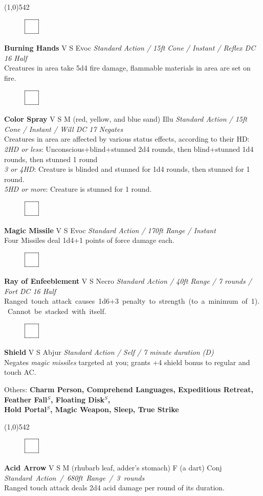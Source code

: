 \documentclass[letterpaper]{article}
\newcommand{\fullline}{\noindent\line(1,0){542} \\}
\newcommand{\spell}[7]{
\begin{figure}
\vspace{-13pt}
\ifstrequal{#2}{Full}{  \includegraphics[width=2em]{Checkbox-Full}}{
\ifstrequal{#2}{Scroll}{\includegraphics[width=2em]{Checkbox-S}}{
                        \includegraphics[width=2em]{Checkbox}}}
\ifstrequal{#7}{}{\vspace{-1em}}{\vspace{#7}}
\end{figure}
\noindent \textbf{#1} #3 {
    \ifstrequal{#4}{Conj}{\color{Plum}Conj}{%
    \ifstrequal{#4}{Divin}{\color{YellowOrange}Divin}{%
    \ifstrequal{#4}{Ench}{\color{VioletRed}Ench}{%
    \ifstrequal{#4}{Trans}{\color{LimeGreen}Trans}{%
    \ifstrequal{#4}{Evoc}{\color{RedOrange}Evoc}{%
    \ifstrequal{#4}{Illu}{\color{ProcessBlue}Illu}{%
    \ifstrequal{#4}{Abjur}{\color{CadetBlue}Abjur}{%
    \ifstrequal{#4}{Necro}{\color{Red}Necro}{%
}}}}}}}}}
{\footnotesize \emph{#5}} \\
#6
}
\newcommand{\s}[0]{$^S$}
\begin{document}
\fullline
\vspace{-1.25em}

\spell{Burning Hands}{}{V S}{Evoc}{Standard Action / 15ft Cone / Instant / Reflex DC 16 Half}{%
Creatures in area take 5d4 fire damage, flammable materials in area are set on fire.}{}\\[-1em] %

\spell{Color Spray}{}{V S M (red, yellow, and blue sand)}{Illu}{Standard Action / 15ft Cone / Instant / Will DC 17 Negates}{%
Creatures in area are affected by various status effects, according to their HD:\\
\emph{2HD or less}: Unconscious+blind+stunned 2d4 rounds, then blind+stunned 1d4 rounds, then stunned 1 round \\
\emph{3 or 4HD}: Creature is blinded and stunned for 1d4 rounds, then stunned for 1 round.\\
\emph{5HD or more}: Creature is stunned for 1 round.}{1em}

\spell{Magic Missile}{}{V S}{Evoc}{Standard Action / 170ft Range / Instant}{%
Four Missiles deal 1d4+1 points of force damage each.}{} \\[-1em] %

\spell{Ray of Enfeeblement}{}{V S}{Necro}{Standard Action / 40ft Range / 7 rounds / Fort DC 16 Half}{%
\mbox{Ranged touch attack causes 1d6+3 penalty to strength (to a minimum of 1).  Cannot be stacked with itself.}}{} \\[-1em] %

\spell{Shield}{}{V S}{Abjur}{Standard Action / Self / 7 minute duration (D)}{%
Negates \emph{magic missiles} targeted at you; grants +4 shield bonus to regular and touch AC.}{}\\[-1em] %

\begin{adjustwidth}{3em}{0em}
Others: \textbf{Charm Person, Comprehend Languages, Expeditious Retreat, Feather Fall\s , Floating Disk\s ,\\ Hold Portal\s , Magic Weapon, Sleep, True Strike} \\[-2em]
\end{adjustwidth}

\fullline
\vspace{-1.25em}

\spell{Acid Arrow}{}{V S M (rhubarb leaf, adder's stomach) F (a dart)}{Conj}{\mbox{Standard Action / 680ft Range / 3 rounds}}{%
Ranged touch attack deals 2d4 acid damage per round of its duration.}{}\\[-1em] %
\end{document}
